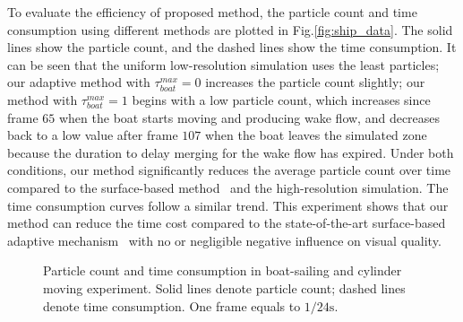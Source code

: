 \documentclass[VANCOUVER,STIX1COL]{WileyNJD-v2}
\begin{document}
To evaluate the efficiency of proposed method, the particle count and time consumption using different methods are plotted in Fig.\ref{fig:ship_data}. The solid lines show the particle count, and the dashed lines show the time consumption. It can be seen that the uniform low-resolution simulation uses the least particles; our adaptive method with $\tau_{boat}^{max} = 0$ increases the particle count slightly; our method with $\tau_{boat}^{max} = 1$ begins with a low particle count, which increases since frame $65$ when the boat starts moving and producing wake flow, and decreases back to a low value after frame $107$ when the boat leaves the simulated zone because the duration to delay merging for the wake flow has expired. Under both conditions, our method significantly reduces the average particle count over time compared to the surface-based method~\cite{Winchenbach17} and the high-resolution simulation. The time consumption curves follow a similar trend. This experiment shows that our method can reduce the time cost compared to the state-of-the-art surface-based adaptive mechanism~\cite{Winchenbach17} with no or negligible negative influence on visual quality.

\begin{figure}
    \centering
    \vspace{-0.7\baselineskip}
    \caption{Particle count and time consumption in boat-sailing and cylinder moving experiment. Solid lines denote particle count; dashed lines denote time consumption. One frame equals to $1/24\mathrm{s}$.}
    
\end{figure}
\end{document}
